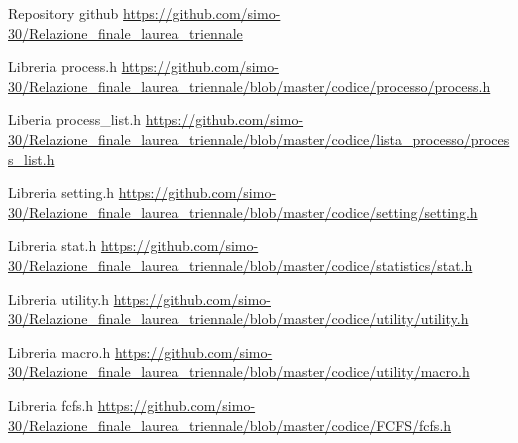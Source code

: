 \documentclass[Lau, oneside]{sapthesis}%
\begin{document}
\backmatter
{}
\begin{thebibliography}{17}

\label{ref:repo}
Repository github \url{https://github.com/simo-30/Relazione_finale_laurea_triennale}

\label{ref:proch}
Libreria process.h \url{https://github.com/simo-30/Relazione_finale_laurea_triennale/blob/master/codice/processo/process.h}

\label{ref:listproch}
Liberia process\_list.h \url{https://github.com/simo-30/Relazione_finale_laurea_triennale/blob/master/codice/lista_processo/process_list.h}

\label{ref:settingh}
Libreria setting.h \url{https://github.com/simo-30/Relazione_finale_laurea_triennale/blob/master/codice/setting/setting.h}

\label{ref:stath}
Libreria stat.h \url{https://github.com/simo-30/Relazione_finale_laurea_triennale/blob/master/codice/statistics/stat.h}

\label{ref:utilityh}
Libreria utility.h \url{https://github.com/simo-30/Relazione_finale_laurea_triennale/blob/master/codice/utility/utility.h}

\label{ref:macroh}
Libreria macro.h \url{https://github.com/simo-30/Relazione_finale_laurea_triennale/blob/master/codice/utility/macro.h}

\label{ref:fcfsh}
Libreria fcfs.h \url{https://github.com/simo-30/Relazione_finale_laurea_triennale/blob/master/codice/FCFS/fcfs.h}

\end{thebibliography}
\end{document}
